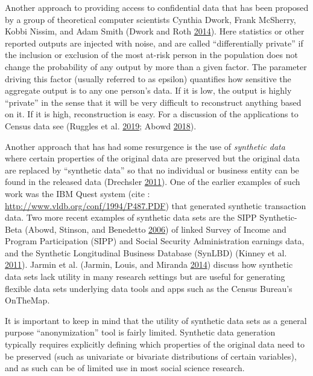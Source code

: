 \documentclass[]{krantz}
\begin{document}
Another approach to providing access to confidential data that has been
proposed by a group of theoretical computer scientists Cynthia Dwork,
Frank McSherry, Kobbi Nissim, and Adam Smith (Dwork and Roth
\protect\hyperlink{ref-Dworkroth2014}{2014}). Here statistics or other
reported outputs are injected with noise, and are called
``differentially private'' if the inclusion or exclusion of the most
at-risk person in the population does not change the probability of any
output by more than a given factor. The parameter driving this factor
(usually referred to as epsilon) quantifies how sensitive the aggregate
output is to any one person's data. If it is low, the output is highly
``private'' in the sense that it will be very difficult to reconstruct
anything based on it. If it is high, reconstruction is easy. For a
discussion of the applications to Census data see (Ruggles et al.
\protect\hyperlink{ref-ruggles2019}{2019}; Abowd
\protect\hyperlink{ref-abowed2018}{2018}).

Another approach that has had some resurgence is the use of
\emph{synthetic data} where certain properties of the original data are
preserved but the original data are replaced by ``synthetic data'' so
that no individual or business entity can be found in the released data
(Drechsler \protect\hyperlink{ref-drechsler2011synthetic}{2011}). One of
the earlier examples of such work was the IBM Quest system (cite :
\url{http://www.vldb.org/conf/1994/P487.PDF}) that generated synthetic
transaction data. Two more recent examples of synthetic data sets are
the SIPP Synthetic-Beta (Abowd, Stinson, and Benedetto
\protect\hyperlink{ref-abowd2006final}{2006}) of linked Survey of Income
and Program Participation (SIPP) and Social Security Administration
earnings data, and the Synthetic Longitudinal Business Database (SynLBD)
(Kinney et al. \protect\hyperlink{ref-kinney2011towards}{2011}). Jarmin
et al. (Jarmin, Louis, and Miranda
\protect\hyperlink{ref-jarmin2014expanding}{2014}) discuss how synthetic
data sets lack utility in many research settings but are useful for
generating flexible data sets underlying data tools and apps such as the
Census Bureau's OnTheMap.

It is important to keep in mind that the utility of synthetic data sets
as a general purpose ``anonymization'' tool is fairly limited. Synthetic
data generation typically requires explicitly defining which properties
of the original data need to be preserved (such as univariate or
bivariate distributions of certain variables), and as such can be of
limited use in most social science research.
\end{document}
